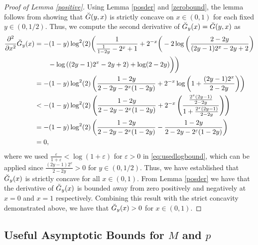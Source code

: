 \documentclass[12pt,reqno]{amsart}
\numberwithin{equation}{section}
\theoremstyle{definition}
\renewcommand{\epsilon}{\varepsilon}
\renewcommand{\[}{\begin{equation}}
\renewcommand{\]}{\end{equation}}
\renewcommand{\|}{\bigg{|}}
\begin{document}
\begin{proof}[Proof of Lemma \ref{positive}]
    Using Lemma \ref{posder} and \ref{zerobound}, the lemma follows from showing that $\Breve{G}(y,x)$ is strictly concave on $x \in (0,1)$ for each fixed $y \in (0,1/2)$. Thus, we compute the second derivative of $\Breve{G}_y(x) = \Breve{G}(y, x)$ as
    \begin{align}
    \frac{\partial^2}{\partial x^2}\Breve{G}_y(x) &= -(1-y) \log ^2(2) \bigg{(}\frac{1}{\frac{1}{1-2 y}-2^x+1}+2^{-x} \bigg{(}-2 \log \left(\frac{2-2 y}{(2 y-1) 2^x-2
   y+2}\right)\\
   &\qquad - \log \left((2 y-1) 2^x-2 y+2\right)+\log (2-2 y)\bigg{)}\bigg{)}\\
   & = -(1-y) \log ^2(2) \left(\frac{1-2y}{2-2y - 2^x(1-2y)} + 2^{-x}\log\left(1+\frac{(2y-1)2^x}{2-2y}\right)\right)\\
   &< -(1-y)\log^2(2)\left(\frac{1-2y}{2-2y - 2^x(1-2y)} + 2^{-x}\left(\frac{\frac{2^x(2y-1)}{2-2y}}{1+\frac{2^x(2y-1)}{2-2y}}\right)\right)\label{eq:usedlogbound}\\
   &= -(1-y)\log^2(2)\left(\frac{1-2y}{2-2y - 2^x(1-2y)} -\frac{1-2y}{2-2y - 2^\epsilon(1-2y)}\right)\\
   &= 0,
   \end{align}
   where we used $\frac{\epsilon}{1+\epsilon} < \log(1+\epsilon)$ for $\epsilon > 0$ in \eqref{eq:usedlogbound}, which can be applied since $\frac{(2y-1)2^x}{2-2y} > 0$ for $y \in (0,1/2)$. Thus, we have established that $\Breve{G}_y(x)$ is strictly concave for all $x \in (0,1)$. From Lemma \ref{posder} we have that the derivative of $\Breve{G}_y(x)$ is bounded away from zero positively and negatively at $x = 0$ and $x = 1$ respectively. Combining this result with the strict concavity demonstrated above, we have that $\Breve{G}_y(x) > 0$ for $x \in (0,1)$.
\end{proof}

\subsection{Useful Asymptotic Bounds for $M$ and $p$}
\end{document}
